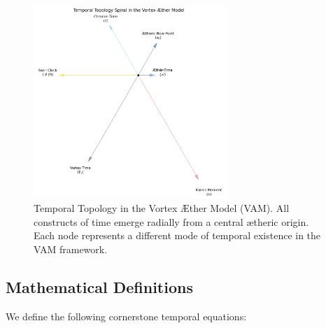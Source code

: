 \begin{figure}[H]
    \centering
    \includegraphics[width=0.65\textwidth]{images/TimeConstruct} %
    \caption{Temporal Topology in the Vortex Æther Model (VAM). All constructs of time emerge radially from a central ætheric origin. Each node represents a different mode of temporal existence in the VAM framework.}
    \label{fig:temporal_swirl}
\end{figure}

\subsection{Mathematical Definitions}

We define the following cornerstone temporal equations:

